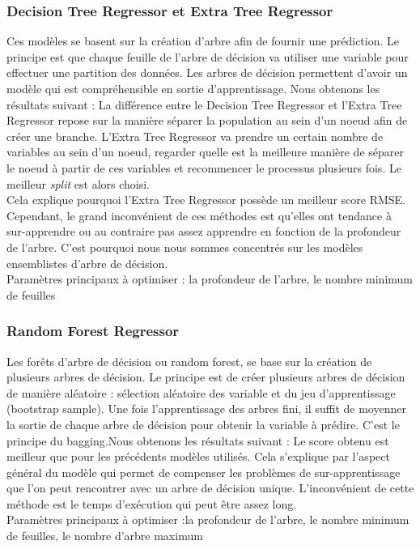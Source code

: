 \documentclass{article} %
\begin{document}
\subsubsection{Decision Tree Regressor et Extra Tree Regressor}
Ces modèles se basent sur la création d'arbre afin de fournir une prédiction. Le principe est que chaque feuille de l'arbre de décision va utiliser une variable pour effectuer une partition des données. Les arbres de décision permettent d'avoir un modèle qui est compréhensible en sortie d'apprentissage. Nous obtenons les résultats suivant :
La différence entre le Decision Tree Regressor et l'Extra Tree Regressor repose sur la manière séparer la population au sein d'un noeud afin de créer une branche. L'Extra Tree Regressor va prendre un certain nombre de variables au sein d'un noeud, regarder quelle est la meilleure manière de séparer le noeud à partir de ces variables et recommencer le processus plusieurs fois. Le meilleur \textit{split} est alors choisi.\\
Cela explique pourquoi l'Extra Tree Regressor possède un meilleur score RMSE. Cependant, le grand inconvénient de ces méthodes est qu'elles ont tendance à sur-apprendre ou au contraire pas assez apprendre en fonction de la profondeur de l'arbre. C'est pourquoi nous nous sommes concentrés sur les modèles ensemblistes d'arbre de décision.\\
Paramètres principaux à optimiser : la profondeur de l'arbre, le nombre minimum de feuilles

\subsubsection{Random Forest Regressor}
Les forêts d'arbre de décision ou random forest, se base sur la création de plusieurs arbres de décision. Le principe est de créer plusieurs arbres de décision de manière aléatoire : sélection aléatoire des variable et du jeu d'apprentissage (bootstrap sample). Une fois l'apprentissage des arbres fini, il suffit de moyenner la sortie de chaque arbre de décision pour obtenir la variable à prédire. C'est le principe du bagging.Nous obtenons les résultats suivant :
Le score obtenu est meilleur que pour les précédents modèles utilisés. Cela s'explique par l'aspect général du modèle qui permet de compenser les problèmes de sur-apprentissage que l'on peut rencontrer avec un arbre de décision unique. L'inconvénient de cette méthode est le temps d'exécution qui peut être assez long.\\
Paramètres principaux à optimiser :la profondeur de l'arbre, le nombre minimum de feuilles, le nombre d'arbre maximum
\end{document}
